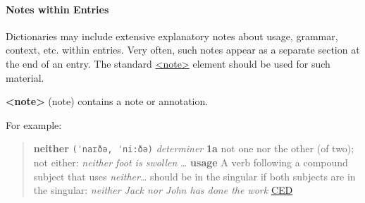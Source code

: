 \paragraph[{Notes within Entries}]{Notes within Entries}\label{DITPNO}\par
Dictionaries may include extensive explanatory notes about usage, grammar, context, etc. within entries. Very often, such notes appear as a separate section at the end of an entry. The standard \hyperref[TEI.note]{<note>} element should be used for such material.
\begin{sansreflist}
  
\item [\textbf{<note>}] (note) contains a note or annotation.
\end{sansreflist}
\par
For example:
\begin{quote}{\bfseries neither} \texttt{(ˈnaɪðə, ˈni:ðə)} {\itshape determiner} {\bfseries 1a} not one nor the other (of two); not either: {\itshape neither foot is swollen} … {\bfseries usage} A verb following a compound subject that uses {\itshape neither}… should be in the singular if both subjects are in the singular: {\itshape neither Jack nor John has done the work} \hyperref[DIC-CED]{CED}\end{quote}
